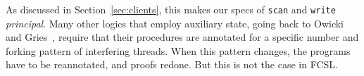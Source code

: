 As discussed in Section~\ref{sec:clients}, this makes our specs of
{\tt scan} and {\tt write} \emph{principal}. Many other logics that
employ auxiliary state, going back to Owicki and
Gries~\cite{Owicki-Gries:CACM76}, require that their procedures are
annotated for a specific number and forking pattern of interfering
threads. When this pattern changes, the programs have to be
reannotated, and proofs redone. But this is not the case in FCSL.

